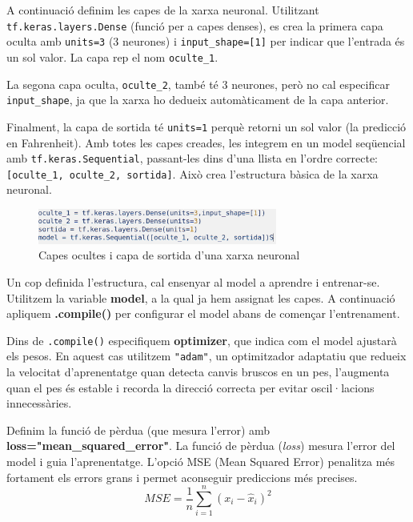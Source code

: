 A continuació definim les capes de la xarxa neuronal. Utilitzant \texttt{tf.keras.layers.Dense} (funció per a capes denses), es crea la primera capa oculta amb \texttt{units=3} (3 neurones) i \texttt{input\_shape=[1]} per indicar que l’entrada és un sol valor. La capa rep el nom \texttt{oculte\_1}.

La segona capa oculta, \texttt{oculte\_2}, també té 3 neurones, però no cal especificar \texttt{input\_shape}, ja que la xarxa ho dedueix automàticament de la capa anterior.

Finalment, la capa de sortida té \texttt{units=1} perquè retorni un sol valor (la predicció en Fahrenheit). Amb totes les capes creades, les integrem en un model seqüencial amb \texttt{tf.keras.Sequential}, passant-les dins d’una llista en l’ordre correcte: \texttt{[oculte\_1, oculte\_2, sortida]}. Això crea l’estructura bàsica de la xarxa neuronal.

\begin{figure}[H]
\centering
\includegraphics[width=0.7\textwidth]{./figures/3.png}
\caption{Capes ocultes i capa de sortida d’una xarxa neuronal}
\end{figure}

Un cop definida l’estructura, cal ensenyar al model a aprendre i entrenar-se. Utilitzem la variable \textbf{model}, a la qual ja hem assignat les capes. A continuació apliquem \textbf{.compile()} per configurar el model abans de començar l’entrenament.

Dins de \texttt{.compile()} especifiquem \textbf{optimizer}, que indica com el model ajustarà els pesos. En aquest cas utilitzem \texttt{"adam"}, un optimitzador adaptatiu que redueix la velocitat d’aprenentatge quan detecta canvis bruscos en un pes, l’augmenta quan el pes és estable i recorda la direcció correcta per evitar oscil·lacions innecessàries.

Definim la funció de pèrdua (que mesura l'error) amb \textbf{loss="mean\_squared\_error"}. La funció de pèrdua (\textit{loss}) mesura l’error del model i guia l’aprenentatge.
L’opció MSE (Mean Squared Error) penalitza més fortament els errors grans i permet aconseguir prediccions més precises.
$$ MSE = \frac{1}{n} \sum_{i=1}^n \left( x_i - \widehat{x}_i\right)^2$$

